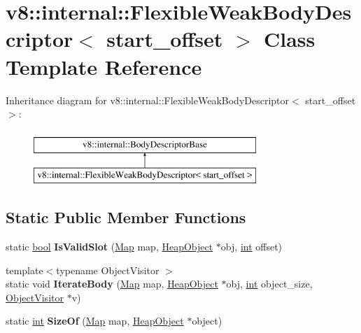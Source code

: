 \hypertarget{classv8_1_1internal_1_1FlexibleWeakBodyDescriptor}{}\section{v8\+:\+:internal\+:\+:Flexible\+Weak\+Body\+Descriptor$<$ start\+\_\+offset $>$ Class Template Reference}
\label{classv8_1_1internal_1_1FlexibleWeakBodyDescriptor}
Inheritance diagram for v8\+:\+:internal\+:\+:Flexible\+Weak\+Body\+Descriptor$<$ start\+\_\+offset $>$\+:\begin{figure}[H]
\begin{center}
\leavevmode
\includegraphics[height=2.000000cm]{classv8_1_1internal_1_1FlexibleWeakBodyDescriptor}
\end{center}
\end{figure}
\subsection*{Static Public Member Functions}
\begin{DoxyCompactItemize}
\item 
\mbox{\label{classv8_1_1internal_1_1FlexibleWeakBodyDescriptor_a5645885340c92567537a97f4200069f0}} 
static \mbox{\hyperlink{classbool}{bool}} {\bfseries Is\+Valid\+Slot} (\mbox{\hyperlink{classv8_1_1internal_1_1Map}{Map}} map, \mbox{\hyperlink{classv8_1_1internal_1_1HeapObject}{Heap\+Object}} $\ast$obj, \mbox{\hyperlink{classint}{int}} offset)
\item 
\mbox{\label{classv8_1_1internal_1_1FlexibleWeakBodyDescriptor_a07b3800a73b78559e1bae2d96db6635d}} 
{\footnotesize template$<$typename Object\+Visitor $>$ }\\static void {\bfseries Iterate\+Body} (\mbox{\hyperlink{classv8_1_1internal_1_1Map}{Map}} map, \mbox{\hyperlink{classv8_1_1internal_1_1HeapObject}{Heap\+Object}} $\ast$obj, \mbox{\hyperlink{classint}{int}} object\+\_\+size, \mbox{\hyperlink{classv8_1_1internal_1_1ObjectVisitor}{Object\+Visitor}} $\ast$v)
\item 
\mbox{\label{classv8_1_1internal_1_1FlexibleWeakBodyDescriptor_a224697bb36316378a6cb8160e8060b53}} 
static \mbox{\hyperlink{classint}{int}} {\bfseries Size\+Of} (\mbox{\hyperlink{classv8_1_1internal_1_1Map}{Map}} map, \mbox{\hyperlink{classv8_1_1internal_1_1HeapObject}{Heap\+Object}} $\ast$object)
\end{DoxyCompactItemize}
